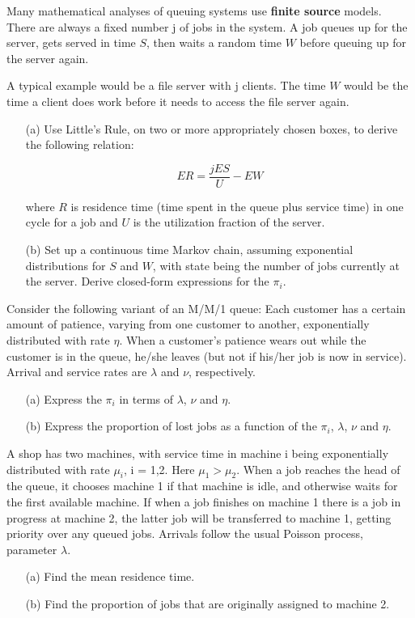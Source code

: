 \oneproblem
Many mathematical analyses of queuing systems use {\bf finite source}
models.  There are always a fixed number j of jobs in the system.  A job
queues up for the server, gets served in time $S$, then waits a 
random time $W$ before queuing up for the server again.  

A typical example would be a file server with j clients.  The time $W$
would be the time a client does work before it needs to access the file
server again.

\begin{itemize}

\item [(a)] Use Little's Rule, on two or more appropriately chosen
boxes, to derive the following relation:

\begin{equation}
ER = \frac{j ES}{U} - EW
\end{equation}

where $R$ is residence time (time spent in the queue plus service time)
in one cycle for a job and $U$ is the utilization fraction of the
server.

\item [(b)] Set up a continuous time Markov chain, assuming exponential
distributions for $S$ and $W$, with state being the number of jobs
currently at the server.  Derive closed-form expressions for the
$\pi_i$.

\end{itemize}

\oneproblem
Consider the following variant of an M/M/1 queue: Each customer has a
certain amount of patience, varying from one customer to another,
exponentially distributed with rate $\eta$.  When a  customer's patience
wears out while the customer is in the queue, he/she leaves (but not
if his/her job is now in service). Arrival and service rates are
$\lambda$ and $\nu$, respectively.

\begin{itemize}

\item [(a)] Express the $\pi_i$ in terms of $\lambda$, $\nu$ and $\eta$.

\item [(b)] Express the proportion of lost jobs as a function of the $\pi_i$,
$\lambda$, $\nu$ and $\eta$.

\end{itemize}

\oneproblem
A shop has two machines, with service time in machine i being
exponentially distributed with rate $\mu_i$, i = 1,2. Here 
$\mu_1 > \mu_2$.  When a job reaches the head of the queue, it 
chooses machine 1 if that machine is idle, and otherwise waits for 
the first available machine. If when a job finishes on machine 1 
there is a job in progress at machine 2, the latter job will be 
transferred to machine 1, getting priority over any queued jobs. 
Arrivals follow the usual Poisson process, parameter $\lambda$.  

\begin{itemize}

\item [(a)] Find the mean residence time.

\item [(b)] Find the proportion of jobs that are originally assigned to
machine 2.  
 
\end{itemize}

